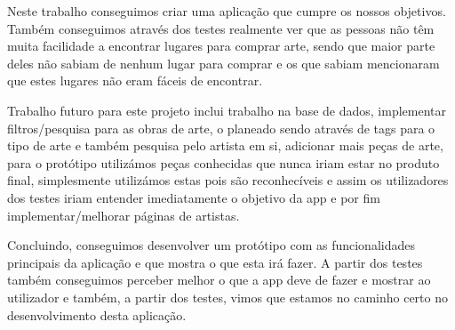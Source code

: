 \documentclass[conference]{IEEEtran}
\begin{document}
Neste trabalho conseguimos criar uma aplicação que cumpre os nossos objetivos. Também conseguimos através dos testes realmente ver que as pessoas não têm muita facilidade a encontrar lugares para comprar arte, sendo que maior parte deles não sabiam de nenhum lugar para comprar e os que sabiam mencionaram que estes lugares não eram fáceis de encontrar.

Trabalho futuro para este projeto inclui trabalho na base de dados, implementar filtros/pesquisa para as obras de arte, o planeado sendo através de tags para o tipo de arte e também pesquisa pelo artista em si, adicionar mais peças de arte, para o protótipo utilizámos peças conhecidas que nunca iriam estar no produto final, simplesmente utilizámos estas pois são reconhecíveis e assim os utilizadores dos testes iriam entender imediatamente o objetivo da app e por fim implementar/melhorar páginas de artistas.

Concluindo, conseguimos desenvolver um protótipo com as funcionalidades principais da aplicação e que mostra o que esta irá fazer. A partir dos testes também conseguimos perceber melhor o que a app deve de fazer e mostrar ao utilizador e também, a partir dos testes, vimos que estamos no caminho certo no desenvolvimento desta aplicação.



\end{document}
